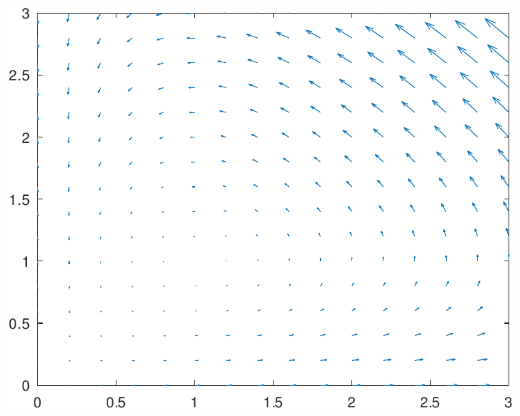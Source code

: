 \begin{frame}
  \begin{center}
    \includegraphics[width=.7\textwidth]{octave/volterra-vectors-crop.pdf}
  \end{center}
\end{frame}

